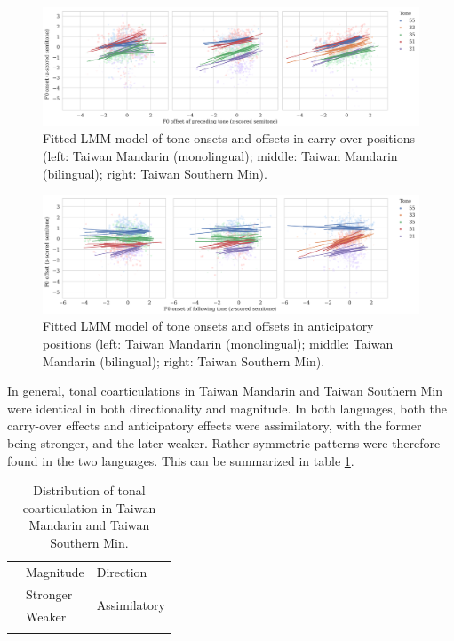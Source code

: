 \begin{figure}[hbt!]
\centering
\includegraphics[width=\textwidth, trim={0 .5cm 0 0}]{figures/E1/Carryover_lang_seperated.png}
\caption{Fitted LMM model of tone onsets and offsets in carry-over positions (left: Taiwan Mandarin (monolingual); middle: Taiwan Mandarin (bilingual); right: Taiwan Southern Min).}
\label{Figure:LMMCarryover}
\end{figure}

\begin{figure}[hbt!]
\centering
\includegraphics[width=\textwidth, trim={0 .5cm 0 0}]{figures/E1/Anticipatory_lang_seperated.png}
\caption{Fitted LMM model of tone onsets and offsets in anticipatory positions (left: Taiwan Mandarin (monolingual); middle: Taiwan Mandarin (bilingual); right: Taiwan Southern Min).}
\label{Figure:LMMAnticipatory}
\end{figure}

In general, tonal coarticulations in Taiwan Mandarin and Taiwan Southern Min were identical in both directionality and magnitude. In both languages, both the carry-over effects and anticipatory effects were assimilatory, with the former being stronger, and the later weaker. Rather symmetric patterns were therefore found in the two languages. This can be summarized in table \ref{table:MandarinDistribution}.

\begin{flushleft}
\begin{table}[hbt!]
\begin{tabularx}{\textwidth}{l|X|X|}
\cline{2-3}
 & Magnitude & Direction \\
\hhline{~|--}\noalign{\vspace*{\doublerulesep}}
\hhline{-||--}
\multicolumn{1}{|X||}{Carry-over} & Stronger & \multirow{2}{*}{Assimilatory}\\
\hhline{|-||-~}
\multicolumn{1}{|X||}{Anticipatory} & Weaker& \\
\hhline{|-||-|-|}
\end{tabularx}
\caption{Distribution of tonal coarticulation in Taiwan Mandarin and Taiwan Southern Min.}
\label{table:MandarinDistribution}
\end{table}
\end{flushleft}

